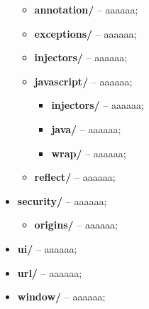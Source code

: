 \begin{itemize}
\begin{itemize}
       \item[] \textbf{annotation/} -- aaaaaa;
       \item[] \textbf{exceptions/} -- aaaaaa;
       \item[] \textbf{injectors/} -- aaaaaa;
       \item[] \textbf{javascript/} -- aaaaaa;
         \begin{itemize}
           \item[] \textbf{injectors/} -- aaaaaa;
           \item[] \textbf{java/} -- aaaaaa;
           \item[] \textbf{wrap/} -- aaaaaa;
         \end{itemize}
       \item[] \textbf{reflect/} -- aaaaaa;
     \end{itemize}
  \item[] \textbf{security/} -- aaaaaa;
     \begin{itemize}
       \item[] \textbf{origins/} -- aaaaaa;
     \end{itemize}
  \item[] \textbf{ui/} -- aaaaaa;
  \item[] \textbf{url/} -- aaaaaa;
  \item[] \textbf{window/} -- aaaaaa;
\end{itemize}


